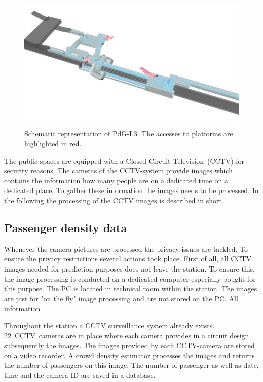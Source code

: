 \begin{figure}[htb]
  \centering
  \includegraphics[width=\linewidth]{Figures/PdG-L3_schematic.jpg} 
  \caption{Schematic representation of PdG-L3. The accesses to platforms are highlighted in red. \cite{TMB}}
  \label{fig:PdG-L3_schematic}
\end{figure}

The public spaces are equipped with a Closed Circuit Television~(CCTV) for security reasons. The cameras of the CCTV-system provide images which contains the information how many people are on a dedicated time on a dedicated place. To gather these information the images needs to be processed. In the following the processing of the CCTV images is described in short.


\subsection{Passenger density data}
\label{subsec:PassengerDensityData}

Whenever the camera pictures are processed the privacy issues are tackled. To ensure the privacy restrictions several actions took place.
First of all, all CCTV images needed for prediction purposes does not leave the station. To ensure this, the image processing is conducted on a dedicated computer especially bought for this purpose. The PC is located in technical room within the station. The images are just for "on the fly" image processing and are not stored on the PC.
All information 

Throughout the station a CCTV surveillance system already exists. 22~CCTV~cameras are in place where each camera provides in a circuit design subsequently the images. The images provided by each CCTV-camera are stored on a video recorder. A crowd density estimator processes the images and returns the number of passengers on this image. The number of passenger as well as date, time and the camera-ID are saved in a database.

